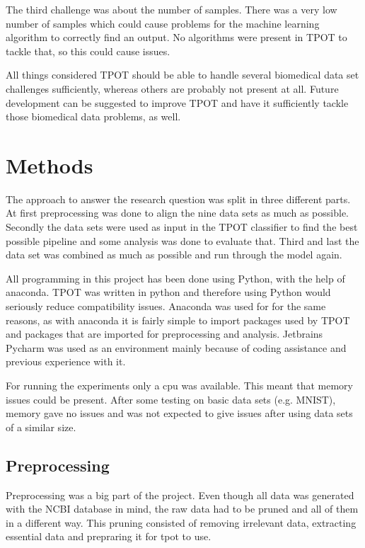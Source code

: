 \documentclass[10pt,a4paper]{article}
\begin{document}
	The third challenge was about the number of samples. There was a very low number of samples which could cause problems for the machine learning algorithm to correctly find an output. No algorithms were present in TPOT to tackle that, so this could cause issues.
	
	All things considered TPOT should be able to handle several biomedical data set challenges sufficiently, whereas others are probably not present at all. Future development can be suggested to improve TPOT and have it sufficiently tackle those biomedical data problems, as well.
	
	\section{Methods}
	\label{sec:Methods}
	
	The approach to answer the research question was split in three different parts. At first preprocessing was done to align the nine data sets as much as possible. Secondly the data sets were used as input in the TPOT classifier to find the best possible pipeline and some analysis was done to evaluate that. Third and last the data set was combined as much as possible and run through the model again. 
	
	All programming in this project has been done using Python, with the help of anaconda. TPOT was written in python and therefore using Python would seriously reduce compatibility issues. Anaconda was used for for the same reasons, as with anaconda it is fairly simple to import packages used by TPOT and packages that are imported for preprocessing and analysis. Jetbrains Pycharm was used as an environment mainly because of coding assistance and previous experience with it.
	
	
	For running the experiments only a cpu was available. This meant that memory issues could be present. After some testing on basic data sets (e.g. MNIST), memory gave no issues and was not expected to give issues after using data sets of a similar size.
	
	\subsection{Preprocessing}
	\label{subsec:Preprocessing}
	
	Preprocessing was a big part of the project. Even though all data was generated with the NCBI database \cite{edgar2002gene} in mind, the raw data had to be pruned and all of them in a different way. This pruning consisted of removing irrelevant data, extracting essential data and prepraring it for tpot to use. 
	
\end{document}
